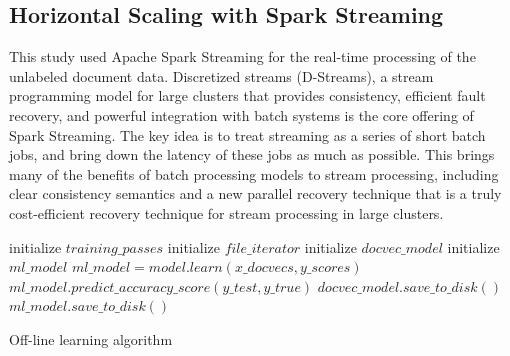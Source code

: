 \documentclass[conference]{IEEEtran}
\begin{document}
    \subsection{Horizontal Scaling with Spark Streaming}
        This study used Apache Spark Streaming for the real-time processing of the unlabeled document data. 
        Discretized streams (D-Streams), a stream programming model for large clusters that provides consistency, efficient fault recovery, and powerful integration with batch systems is the core offering of Spark Streaming. 
        The key idea is to treat streaming as a series of short batch jobs, and bring down the latency of these jobs as much as possible. 
        This brings many of the benefits of batch processing models to stream processing, including clear consistency semantics and a new parallel recovery technique that is a truly cost-efficient recovery technique for stream processing in large clusters\cite{zaharia2012discretized}.

    \begin{algorithm}[ht]
        \DontPrintSemicolon 
        \;
        initialize $training\_passes$\;
        initialize $file\_iterator$\;
        initialize $docvec\_model$\;
        initialize $ml\_model$\;
        \;
        \;
        \;
        \;
        $ml\_model = model.learn(x\_docvecs, y\_scores)$\;
        $ml\_model.predict\_accuracy\_score(y\_test, y\_true)$\;
        \;
        $docvec\_model.save\_to\_disk()$\;
        $ml\_model.save\_to\_disk()$\;
        \;
        \caption{Off-line learning algorithm}
         \label{offline_module_algo}
    \end{algorithm}
\end{document}
